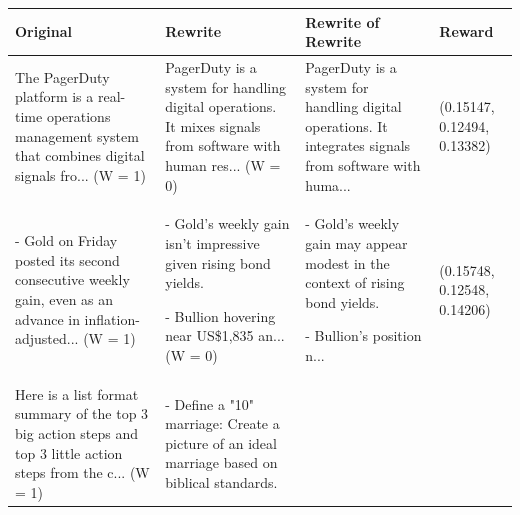 \documentclass{article}
\begin{document}
\begin{table}[H]
  \centering
  \small
  \begin{tabular}{|p{}|p{}|p{}|p{}|}\hline
  Original & Rewrite & Rewrite of Rewrite & Reward \\ \hline
  The PagerDuty platform is a real-time operations management system that combines digital signals fro... (W = 1) & PagerDuty is a system for handling digital operations. It mixes signals from software with human res... (W = 0) & PagerDuty is a system for handling digital operations. It integrates signals from software with huma... & (0.15147, 0.12494, 0.13382) \\ \hline
  - Gold on Friday posted its second consecutive weekly gain, even as an advance in inflation-adjusted... (W = 1) & - Gold's weekly gain isn't impressive given rising bond yields.

  - Bullion hovering near US\$1,835 an... (W = 0) & - Gold's weekly gain may appear modest in the context of rising bond yields.

  - Bullion's position n... & (0.15748, 0.12548, 0.14206) \\ \hline
  Here is a list format summary of the top 3 big action steps and top 3 little action steps from the c... (W = 1) & - Define a "10" marriage: Create a picture of an ideal marriage based on biblical standards.


\end{tabular}
\end{table}
\end{document}
